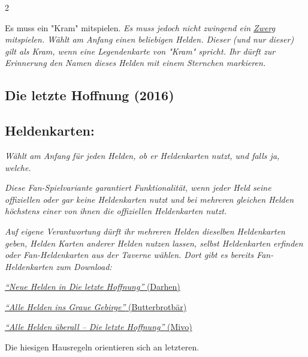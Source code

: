 \documentclass[10pt, a4paper, oneside]{book}
\newcommand{\fan}[1]{\textit{#1}}
\begin{document}
\begin{multicols*}{2}
\begin{bgcolor}
Es muss ein "Kram" mitspielen.
\supercite{bl-kuc-a}
\fan{Es muss jedoch nicht zwingend ein \hyperref[zwerg]{Zwerg} mitspielen. Wählt am Anfang einen beliebigen Helden. Dieser (und nur dieser) gilt als Kram, wenn eine Legendenkarte von "Kram" spricht. Ihr dürft zur Erinnerung den Namen dieses Helden mit einem Sternchen markieren.}

\end{bgcolor}








\begin{bgcolor}
\section{Die letzte Hoffnung (2016)}





\subsection{Heldenkarten:}

\fan{Wählt am Anfang für jeden Helden, ob er Heldenkarten nutzt, und falls ja, welche.}

\fan{Diese Fan-Spielvariante garantiert Funktionalität, wenn jeder Held seine offiziellen oder gar keine Heldenkarten nutzt und bei mehreren gleichen Helden höchstens einer von ihnen die offiziellen Heldenkarten nutzt.}

\fan{Auf eigene Verantwortung dürft ihr mehreren Helden dieselben Heldenkarten geben, Helden Karten anderer Helden nutzen lassen, selbst Heldenkarten erfinden oder Fan-Heldenkarten aus der Taverne wählen. Dort gibt es bereits Fan-Heldenkarten zum Download:}

\href{https://legenden-von-andor.de/forum/viewtopic.php?p=103303#p103303}
{\blacktriangleright \fan{\enquote{Neue Helden in Die letzte Hoffnung}} (Darhen)}

\href{https://legenden-von-andor.de/forum/viewtopic.php?p=56931#p56931}
{\blacktriangleright \fan{\enquote{Alle Helden ins Graue Gebirge}} (Butterbrotbär)}

\href{https://legenden-von-andor.de/forum/viewtopic.php?p=136266#p136266}
{\blacktriangleright \fan{\enquote{Alle Helden überall – Die letzte Hoffnung}} (Mivo)}

Die hiesigen Hausregeln orientieren sich an letzteren.






\end{bgcolor}
\end{multicols*}
\end{document}
